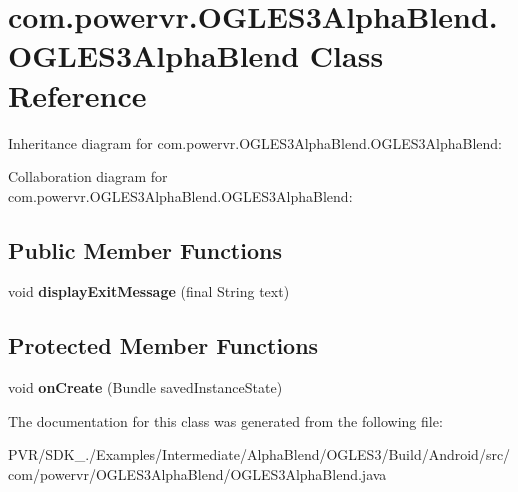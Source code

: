 \hypertarget{classcom_1_1powervr_1_1_o_g_l_e_s3_alpha_blend_1_1_o_g_l_e_s3_alpha_blend}{\section{com.\+powervr.\+O\+G\+L\+E\+S3\+Alpha\+Blend.\+O\+G\+L\+E\+S3\+Alpha\+Blend Class Reference}
\label{classcom_1_1powervr_1_1_o_g_l_e_s3_alpha_blend_1_1_o_g_l_e_s3_alpha_blend}
}


Inheritance diagram for com.\+powervr.\+O\+G\+L\+E\+S3\+Alpha\+Blend.\+O\+G\+L\+E\+S3\+Alpha\+Blend\+:


Collaboration diagram for com.\+powervr.\+O\+G\+L\+E\+S3\+Alpha\+Blend.\+O\+G\+L\+E\+S3\+Alpha\+Blend\+:
\subsection*{Public Member Functions}
\begin{DoxyCompactItemize}
\item 
\hypertarget{classcom_1_1powervr_1_1_o_g_l_e_s3_alpha_blend_1_1_o_g_l_e_s3_alpha_blend_a6f34cf2c01f599853f77bb10fc6e4146}{void {\bfseries display\+Exit\+Message} (final String text)}\label{classcom_1_1powervr_1_1_o_g_l_e_s3_alpha_blend_1_1_o_g_l_e_s3_alpha_blend_a6f34cf2c01f599853f77bb10fc6e4146}

\end{DoxyCompactItemize}
\subsection*{Protected Member Functions}
\begin{DoxyCompactItemize}
\item 
\hypertarget{classcom_1_1powervr_1_1_o_g_l_e_s3_alpha_blend_1_1_o_g_l_e_s3_alpha_blend_a75a88d3de6a857a55189629fcfec497c}{void {\bfseries on\+Create} (Bundle saved\+Instance\+State)}\label{classcom_1_1powervr_1_1_o_g_l_e_s3_alpha_blend_1_1_o_g_l_e_s3_alpha_blend_a75a88d3de6a857a55189629fcfec497c}

\end{DoxyCompactItemize}


The documentation for this class was generated from the following file\+:\begin{DoxyCompactItemize}
\item 
P\+V\+R/\+S\+D\+K\+\_./\+Examples/\+Intermediate/\+Alpha\+Blend/\+O\+G\+L\+E\+S3/\+Build/\+Android/src/com/powervr/\+O\+G\+L\+E\+S3\+Alpha\+Blend/O\+G\+L\+E\+S3\+Alpha\+Blend.\+java\end{DoxyCompactItemize}
